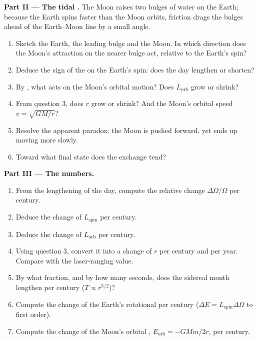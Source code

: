 \begin{problem}
\medskip
\noindent\textbf{Part II --- The tidal .}
The Moon raises two bulges of water on the Earth; because the Earth
spins faster than the Moon orbits, friction drags the bulges ahead of
the Earth--Moon line by a small angle.
\begin{enumerate}[resume]
  \item Sketch the Earth, the leading bulge and the Moon. In which
        direction does the Moon's attraction on the nearer bulge act,
        relative to the Earth's spin?
  \item Deduce the sign of the  on the Earth's spin: does the
        day lengthen or shorten?
  \item By , what  acts on the Moon's orbital
        motion? Does $L_{\text{orb}}$ grow or shrink?
  \item From question 3, does $r$ grow or shrink? And the Moon's orbital
        speed $v = \sqrt{GM/r}$?
  \item Resolve the apparent paradox: the Moon is pushed forward, yet
        ends up moving more slowly.
  \item Toward what final state does the exchange tend?
\end{enumerate}

\medskip
\noindent\textbf{Part III --- The numbers.}
\begin{enumerate}[resume]
  \item From the lengthening of the day, compute the relative change
        $\Delta\Omega/\Omega$ per century.
  \item Deduce the change of $L_{\text{spin}}$ per century.
  \item Deduce the change of $L_{\text{orb}}$ per century.
  \item Using question 3, convert it into a change of $r$ per century
        and per year. Compare with the laser-ranging value.
  \item By what fraction, and by how many seconds, does the sidereal
        month lengthen per century ($T \propto r^{3/2}$)?
  \item Compute the change of the Earth's rotational 
        per century ($\Delta E = L_{\text{spin}}\Delta\Omega$ to first
        order).
  \item Compute the change of the Moon's orbital ,
        $E_{\text{orb}} = -GMm/2r$, per century.
\end{enumerate}


\end{problem}
